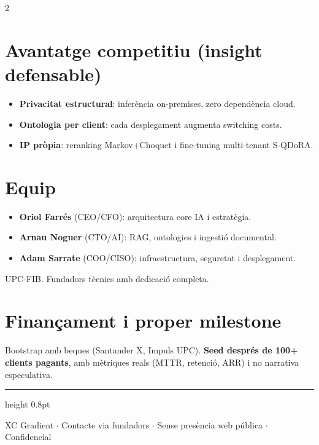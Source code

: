 \documentclass[10pt,a4paper]{article}
\begin{document}
\begin{multicols}{2}
\section{Avantatge competitiu (insight defensable)}
\begin{itemize}[leftmargin=1em,itemsep=1pt,topsep=2pt]
\item \textbf{Privacitat estructural}: infer\`encia on-premises, zero depend\`encia cloud.
\item \textbf{Ontologia per client}: cada desplegament augmenta switching costs.
\item \textbf{IP pr\`opia}: reranking Markov+Choquet i fine-tuning multi-tenant S-QDoRA.
\end{itemize}

\section{Equip}
\begin{itemize}[leftmargin=1em,itemsep=1pt,topsep=2pt]
\item \textbf{Oriol Farr\'es} (CEO/CFO): arquitectura core IA i estrat\`egia.
\item \textbf{Arnau Noguer} (CTO/AI): RAG, ontologies i ingesti\'o documental.
\item \textbf{Adam Sarrate} (COO/CISO): infraestructura, seguretat i desplegament.
\end{itemize}
UPC-FIB. Fundadors t\`ecnics amb dedicaci\'o completa.

\section{Finan\c{c}ament i proper milestone}
Bootstrap amb beques (Santander X, Impuls UPC). \textbf{Seed despr\'es de 100+ clients pagants}, amb m\`etriques reals (MTTR, retenci\'o, ARR) i no narrativa especulativa.

\end{multicols}

\vspace{0.2em}
{\color{accent}\hrule height 0.8pt}
\vspace{0.15em}
\begin{center}
\small\textcolor{midgray}{XC Gradient $\cdot$ Contacte via fundadors $\cdot$ Sense pres\`encia web p\'ublica $\cdot$ Confidencial}
\end{center}
\end{document}
